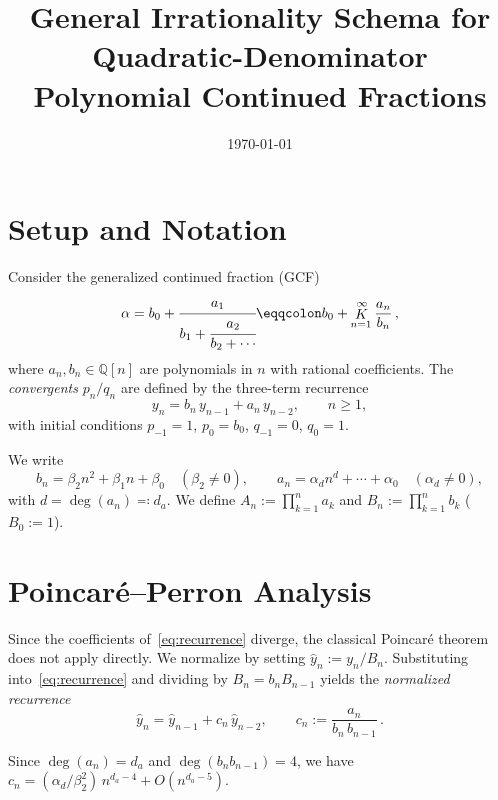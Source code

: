 \documentclass[11pt,a4paper]{article}
\title{General Irrationality Schema for Quadratic-Denominator\\Polynomial Continued Fractions}
\author{}
\date{\today}
\theoremstyle{definition}
\theoremstyle{remark}
\begin{document}
\maketitle

\section{Setup and Notation}

Consider the generalized continued fraction (GCF)
\[
  \alpha = b_0 + \cfrac{a_1}{b_1 + \cfrac{a_2}{b_2 + \cdots}}
  \eqqcolon b_0 + \mathop{K}_{n=1}^{\infty}\frac{a_n}{b_n}\,,
\]
where $a_n, b_n \in \mathbb{Q}[n]$ are polynomials in $n$ with rational coefficients.
The \emph{convergents} $p_n/q_n$ are defined by the three-term recurrence
\begin{equation}\label{eq:recurrence}
  y_n = b_n\, y_{n-1} + a_n\, y_{n-2}, \qquad n \geq 1,
\end{equation}
with initial conditions $p_{-1} = 1$, $p_0 = b_0$, $q_{-1} = 0$, $q_0 = 1$.

We write
\[
  b_n = \beta_2 n^2 + \beta_1 n + \beta_0 \quad (\beta_2 \neq 0), \qquad
  a_n = \alpha_d n^d + \cdots + \alpha_0 \quad (\alpha_d \neq 0),
\]
with $d = \deg(a_n) \eqqcolon d_a$.  We define $A_n := \prod_{k=1}^n a_k$
and $B_n := \prod_{k=1}^n b_k$ ($B_0 := 1$).


\section{Poincar\'e--Perron Analysis}\label{sec:poincare}

Since the coefficients of~\eqref{eq:recurrence} diverge, the classical
Poincar\'e theorem does not apply directly.  We normalize by setting
$\hat{y}_n := y_n / B_n$.  Substituting into~\eqref{eq:recurrence}
and dividing by $B_n = b_n B_{n-1}$ yields the \emph{normalized recurrence}
\begin{equation}\label{eq:normalized}
  \hat{y}_n = \hat{y}_{n-1} + c_n\, \hat{y}_{n-2},
  \qquad c_n := \frac{a_n}{b_n\, b_{n-1}}\,.
\end{equation}

Since $\deg(a_n) = d_a$ and $\deg(b_n b_{n-1}) = 4$, we have
$c_n = (\alpha_d / \beta_2^2)\, n^{d_a - 4} + O(n^{d_a - 5})$.
\end{document}
